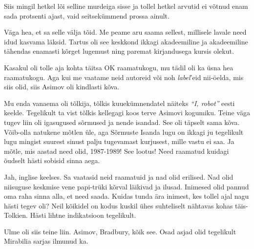 Siis mingil hetkel lõi selline murdeiga sisse ja tollel hetkel arvutid ei 
võtnud enam sada protsenti ajast, vaid seitsekümmend prossa ainult. 


Väga hea, et sa selle välja tõid. Me peame aru saama sellest, millisele lavale  
need idud  kasvama läksid. 
Tartus oli see keskkond  ikkagi akadeemiline ja akadeemiline tähendas 
enamasti kõrget lugemust ning paremat kirjandusega kursis olekut.

Kasakul oli tolle aja kohta täitsa OK raamatukogu, 
mu tädil oli ka üsna hea raamatukogu. Aga kui me vaatame neid autoreid või noh 
\emph{label}'eid nii-öelda, mis siis olid, siis Asimov oli 
kindlasti kõva. 

Mu enda vanaema oli tõlkija, tõlkis kuuekümnendatel näiteks \emph{\enquote{I, 
robot}} eesti keelde. Tegelikult ta vist tõlkis kellegagi koos terve Asimovi 
kogumiku. Teine väga tugev liin oli igasugused sõrmused ja nende 
isandad. See oli täpselt sama kõva.
Võib-olla natukene mõtlen üle, aga Sõrmuste Isanda lugu  on ikkagi 
ju tegelikult lugu  mingist suurest sinust palju tugevamast kurjusest, mille 
vastu ei saa. Ja mõtle, mis aastad need olid, 1987-1989! See lootus! Need 
raamatud kuidagi õudselt hästi sobisid sinna aega.


Jah, inglise keelses. Sa vaatasid neid raamatuid ja nad olid erilised. Nad olid 
niisuguse keskmise vene  papi-trüki kõrval läikivad ja ilusad. Inimesed olid 
pannud oma  raha sinna alla, et need saada.  Kuidas tunda ära   
inimest, kes tollel ajal nagu hästi tegev oli? Neil kõikidel on kodus kuskil 
ühes suhteliselt nähtavas kohas  täis-Tolkien. Hästi lihtne indikatsioon 
tegelikult. 

Ulme  oli siis  teine liin. Asimov, Bradbury, kõik 
see. Osad asjad olid tegelikult Mirabilia sarjas 
ilmunud ka. 

